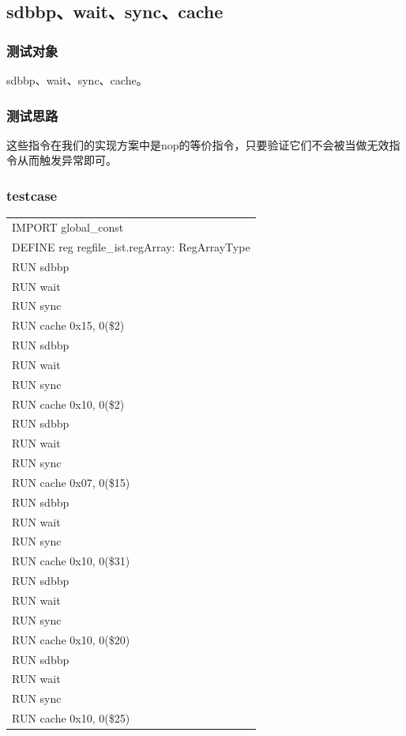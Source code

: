 \documentclass[11pt,utf8]{article}
\begin{document}
{{\subsection{sdbbp、wait、sync、cache} {
\subsubsection{测试对象} {
sdbbp、wait、sync、cache。
}
\subsubsection{测试思路} {
这些指令在我们的实现方案中是nop的等价指令，只要验证它们不会被当做无效指令从而触发异常即可。
}
\subsubsection{testcase} {
\begin{center}	\begin{longtable}{p{15cm}} \hline
		IMPORT{ }global\_const\\
		DEFINE{ }reg{ }regfile\_ist.regArray:{ }RegArrayType\\
		RUN{ }sdbbp\\
		RUN{ }wait\\
		RUN{ }sync\\
		RUN{ }cache{ }0x15,{ }0(\$2)\\
		RUN{ }sdbbp\\
		RUN{ }wait\\
		RUN{ }sync\\
		RUN{ }cache{ }0x10,{ }0(\$2)\\
		RUN{ }sdbbp\\
		RUN{ }wait\\
		RUN{ }sync\\
		RUN{ }cache{ }0x07,{ }0(\$15)\\
		RUN{ }sdbbp\\
		RUN{ }wait\\
		RUN{ }sync\\
		RUN{ }cache{ }0x10,{ }0(\$31)\\
		RUN{ }sdbbp\\
		RUN{ }wait\\
		RUN{ }sync\\
		RUN{ }cache{ }0x10,{ }0(\$20)\\
		RUN{ }sdbbp\\
		RUN{ }wait\\
		RUN{ }sync\\
		RUN{ }cache{ }0x10,{ }0(\$25)\\

\end{longtable}
\end{center}}}}}
\end{document}
